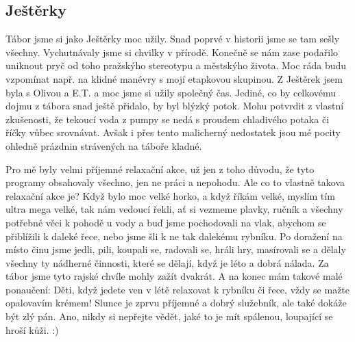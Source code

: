 \subsection*{Ještěrky} %
\label{sub:ještěrky}

\begin{multicols}{2}


Tábor jsme si jako Ještěrky moc užily. Snad poprvé v historii jsme se tam sešly všechny. Vychutnávaly jsme si chvilky v přírodě. Konečně se nám zase podařilo uniknout pryč od toho pražskýho stereotypu a městskýho života. Moc ráda budu vzpomínat např. na klidné manévry s mojí etapkovou skupinou. Z Ještěrek jsem byla s Olivou a E.T. a moc jsme si užily společný čas. Jediné, co by celkovému dojmu z tábora snad ještě přidalo, by byl blýzký potok. Mohu potvrdit z vlastní zkušenosti, že tekoucí voda z pumpy se nedá s proudem chladivého potaka či říčky vůbec srovnávat. Avšak i přes tento malicherný nedostatek jsou mé pocity ohledně prázdnin strávených na táboře kladné.


Pro mě byly velmi příjemné relaxační akce, už jen z toho důvodu, že tyto programy obsahovaly všechno, jen ne práci a nepohodu.
Ale co to vlastně takova relaxační akce je? 
Když bylo moc velké horko, a když říkám velké, myslím tím ultra mega velké, tak nám vedoucí řekli, ať si vezmeme plavky, ručník a všechny potřebné věci k pohodě u vody a buď jsme pochodovali na vlak, abychom se přiblížili k daleké řece, nebo jsme šli k ne tak dalekému rybníku.
Po doražení na místo činu jsme jedli, pili, koupali se, radovali se, hráli hry, masírovali se a dělaly všechny ty nádherné činnosti, které se dělají, když je léto a dobrá nálada.
Za tábor jsme tyto rajské chvíle mohly zažít dvakrát.
A na konec mám takové malé ponaučení: 
Děti, když jedete ven v létě relaxovat k rybníku či řece, vždy se mažte opalovavím krémem!
Slunce je zprvu příjemné a dobrý služebník, ale také dokáže být zlý pán. Ano, nikdy si nepřejte vědět, jaké to je mít spálenou, loupající se hroší kůži. :)


\end{multicols}
